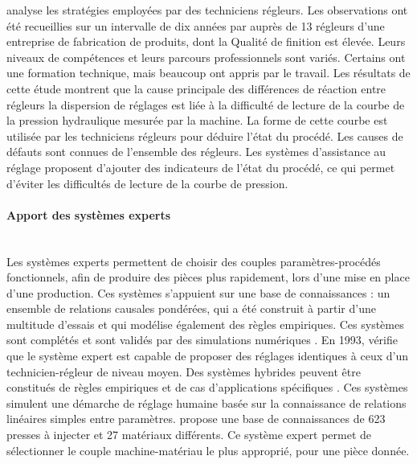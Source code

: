 \cite{richard_analyse_2009} analyse les stratégies employées par des techniciens régleurs.
Les observations ont été recueillies sur un intervalle de dix années par \cite{pastre_role_1994, pastre_role_2004} auprès de 13 régleurs d’une entreprise de fabrication de produits, dont la Qualité de finition est élevée.
Leurs niveaux de compétences et leurs parcours professionnels sont variés. Certains ont une formation technique, mais beaucoup ont appris par le travail.
Les résultats de cette étude montrent que la cause principale des différences de réaction entre régleurs \textemdash la dispersion de réglages \textemdash est liée à la difficulté de lecture de la courbe de la pression hydraulique mesurée par la machine.
La forme de cette courbe est utilisée par les techniciens régleurs pour déduire l’état du procédé.
Les causes de défauts sont connues de l’ensemble des régleurs.
Les systèmes d'assistance au réglage proposent d'ajouter des indicateurs de l’état du procédé, ce qui permet d'éviter les difficultés de lecture de la courbe de pression.

\paragraph{Apport des systèmes experts}\mbox{} \\
Les systèmes experts permettent de choisir des couples paramètres-procédés fonctionnels, afin de produire des pièces plus rapidement, lors d'une mise en place d'une production.
Ces systèmes s’appuient sur une base de connaissances : un ensemble de relations causales pondérées, qui a été construit à partir d'une multitude d'essais et qui modélise également des règles empiriques.
Ces systèmes sont complétés et sont validés par des simulations numériques \cite{jan_expert_1992}.
En 1993, \cite{kameoka_development_1993} vérifie que le système expert est capable de proposer des réglages identiques à ceux d’un technicien-régleur de niveau moyen.
Des systèmes hybrides peuvent être constitués de règles empiriques et de cas d'applications spécifiques \cite{shelesh-nezhad_intelligent_1997}.
Ces systèmes simulent une démarche de réglage humaine basée sur la connaissance de relations linéaires simples entre paramètres.
\cite{bozdana_development_2002} propose une base de connaissances de 623 presses à injecter et 27 matériaux différents.
Ce système expert permet de sélectionner le couple machine-matériau le plus approprié, pour une pièce donnée.

